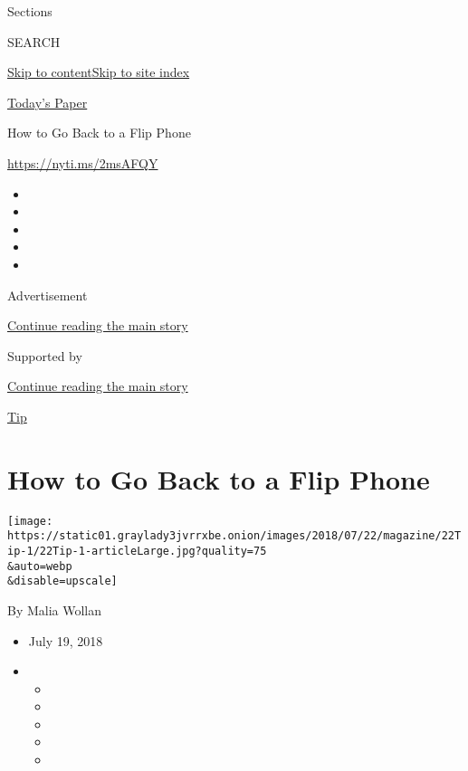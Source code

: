 Sections

SEARCH

\protect\hyperlink{site-content}{Skip to
content}\protect\hyperlink{site-index}{Skip to site index}

\href{https://myaccount.nytimes3xbfgragh.onion/auth/login?response_type=cookie\&client_id=vi}{}

\href{https://www.nytimes3xbfgragh.onion/section/todayspaper}{Today's
Paper}

How to Go Back to a Flip Phone

\url{https://nyti.ms/2msAFQY}

\begin{itemize}
\item
\item
\item
\item
\item
\end{itemize}

Advertisement

\protect\hyperlink{after-top}{Continue reading the main story}

Supported by

\protect\hyperlink{after-sponsor}{Continue reading the main story}

\href{/column/magazine-tip}{Tip}

\hypertarget{how-to-go-back-to-a-flip-phone}{%
\section{How to Go Back to a Flip
Phone}\label{how-to-go-back-to-a-flip-phone}}

\texttt{[image: https://static01.graylady3jvrrxbe.onion/images/2018/07/22/magazine/22Tip-1/22Tip-1-articleLarge.jpg?quality=75\\\&auto=webp\\\&disable=upscale]}

By Malia Wollan

\begin{itemize}
\item
  July 19, 2018
\item
  \begin{itemize}
  \item
  \item
  \item
  \item
  \item
  \end{itemize}
\end{itemize}

